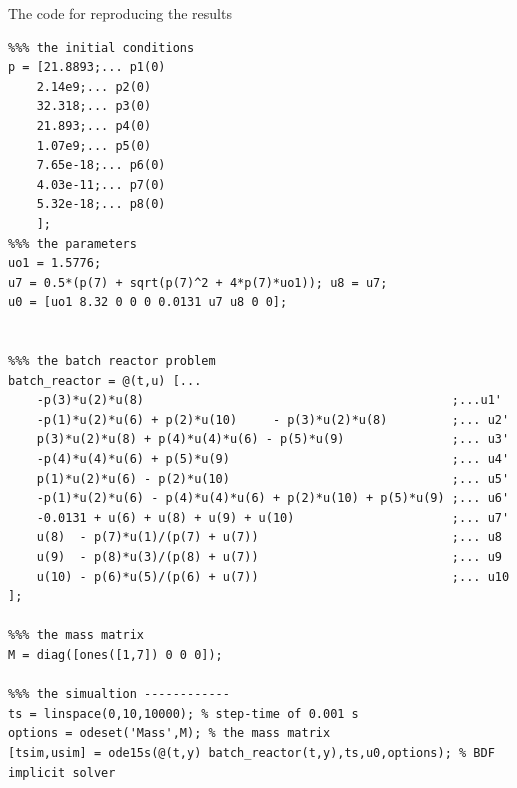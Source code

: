 The code for reproducing the results 
\begin{lstlisting}
%%% the initial conditions
p = [21.8893;... p1(0)
	2.14e9;... p2(0)
	32.318;... p3(0)
	21.893;... p4(0)
	1.07e9;... p5(0)
	7.65e-18;... p6(0)
	4.03e-11;... p7(0)
	5.32e-18;... p8(0)
	];
%%% the parameters
uo1 = 1.5776;
u7 = 0.5*(p(7) + sqrt(p(7)^2 + 4*p(7)*uo1)); u8 = u7;
u0 = [uo1 8.32 0 0 0 0.0131 u7 u8 0 0];


%%% the batch reactor problem
batch_reactor = @(t,u) [...
	-p(3)*u(2)*u(8)											  ;...u1'
	-p(1)*u(2)*u(6) + p(2)*u(10)     - p(3)*u(2)*u(8)         ;... u2'
	p(3)*u(2)*u(8) + p(4)*u(4)*u(6) - p(5)*u(9)               ;... u3'
	-p(4)*u(4)*u(6) + p(5)*u(9)                               ;... u4'
	p(1)*u(2)*u(6) - p(2)*u(10)                               ;... u5'
	-p(1)*u(2)*u(6) - p(4)*u(4)*u(6) + p(2)*u(10) + p(5)*u(9) ;... u6'
	-0.0131 + u(6) + u(8) + u(9) + u(10)                      ;... u7'    
	u(8)  - p(7)*u(1)/(p(7) + u(7))                           ;... u8
	u(9)  - p(8)*u(3)/(p(8) + u(7))                           ;... u9
	u(10) - p(6)*u(5)/(p(6) + u(7))                           ;... u10
];

%%% the mass matrix
M = diag([ones([1,7]) 0 0 0]);

%%% the simualtion ------------
ts = linspace(0,10,10000); % step-time of 0.001 s
options = odeset('Mass',M); % the mass matrix
[tsim,usim] = ode15s(@(t,y) batch_reactor(t,y),ts,u0,options); % BDF implicit solver
\end{lstlisting}

